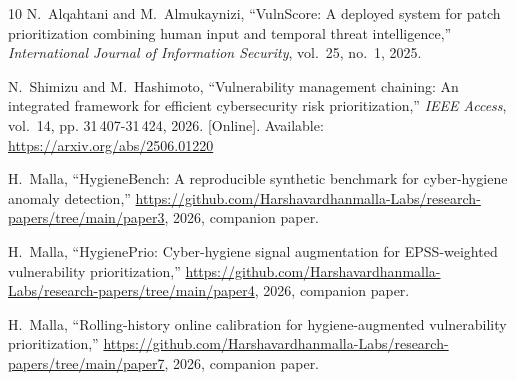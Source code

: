 \documentclass[journal]{IEEEtran}
\begin{document}
\begin{thebibliography}{10}
N.~Alqahtani and M.~Almukaynizi, ``{VulnScore}: A deployed system for patch
  prioritization combining human input and temporal threat intelligence,''
  \emph{International Journal of Information Security}, vol.~25, no.~1, 2025.

\BIBentryALTinterwordspacing
N.~Shimizu and M.~Hashimoto, ``Vulnerability management chaining: An integrated
  framework for efficient cybersecurity risk prioritization,'' \emph{IEEE
  Access}, vol.~14, pp. 31\,407-31\,424, 2026. [Online]. Available:
  \url{https://arxiv.org/abs/2506.01220}
\BIBentrySTDinterwordspacing

\BIBentryALTinterwordspacing
H.~Malla, ``{HygieneBench}: A reproducible synthetic benchmark for cyber-hygiene anomaly detection,'' \url{https://github.com/Harshavardhanmalla-Labs/research-papers/tree/main/paper3}, 2026, companion paper.
\BIBentrySTDinterwordspacing

\BIBentryALTinterwordspacing
H.~Malla, ``{HygienePrio}: Cyber-hygiene signal augmentation for {EPSS}-weighted vulnerability prioritization,'' \url{https://github.com/Harshavardhanmalla-Labs/research-papers/tree/main/paper4}, 2026, companion paper.
\BIBentrySTDinterwordspacing

\BIBentryALTinterwordspacing
H.~Malla, ``Rolling-history online calibration for hygiene-augmented vulnerability prioritization,'' \url{https://github.com/Harshavardhanmalla-Labs/research-papers/tree/main/paper7}, 2026, companion paper.
\BIBentrySTDinterwordspacing

\end{thebibliography}
\end{document}
